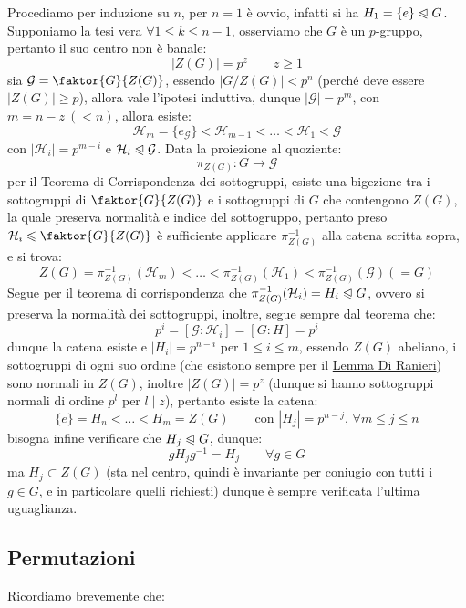\documentclass[11pt]{scrartcl}
\begin{document}
\begin{soln}
    Procediamo per induzione su $n$, per $n = 1$ è ovvio, infatti si ha $H_1 = \{e\} \trianglelefteqslant G$.
    Supponiamo la tesi vera $\forall 1 \leq k \leq n-1$, osserviamo che $G$ è un $p$-gruppo, pertanto il suo centro non è banale:
        \[ |Z(G)| = p^z \qquad z\geq 1
            \]
    sia $\mathcal{G} = \faktor{G}{Z(G)}$, essendo $|G/Z(G)| < p^n$ (perché deve essere $|Z(G)| \geq p$), allora vale l'ipotesi induttiva, dunque
    $|\mathcal{G}| = p^m$, con $m = n-z\ (<n)$, allora esiste:
        \[ \mathcal{H}_m = \{e_{\mathcal{G}}\} < \mathcal{H}_{m-1} < \ldots < \mathcal{H}_1 < \mathcal{G}
            \]
    con $|\mathcal{H}_i| = p^{m-i}$ e $\mathcal{H}_i \trianglelefteqslant \mathcal{G}$. Data la proiezione al quoziente:
        \[ \pi_{Z(G)} : G \longrightarrow \mathcal{G}
            \]
    per il Teorema di Corrispondenza dei sottogruppi, esiste una bigezione tra i sottogruppi di $\faktor{G}{Z(G)}$ e i sottogruppi di
    $G$ che contengono $Z(G)$, la quale preserva normalità e indice del sottogruppo, pertanto preso $\mathcal{H}_i \leqslant \faktor{G}{Z(G)}$ è sufficiente
    applicare $\pi_{Z(G)}^{-1}$ alla catena scritta sopra, e si trova:
        \[ Z(G) = \pi_{Z(G)}^{-1}(\mathcal{H}_{m}) < \ldots < \pi_{Z(G)}^{-1}(\mathcal{H}_{1}) < \pi_{Z(G)}^{-1}(\mathcal{G}) (= G)
            \]
    Segue per il teorema di corrispondenza che $\pi_{Z(G)}^{-1}(\mathcal{H}_i) = H_i \trianglelefteqslant G$, ovvero si preserva la normalità dei sottogruppi, inoltre,
    segue sempre dal teorema che:
        \[ p^i = [\mathcal{G} : \mathcal{H}_i] = [G : H] = p^i
            \]
    dunque la catena esiste  e $|H_i| = p^{n-i}$ per $1\leq i \leq m$, essendo $Z(G)$ abeliano, i sottogruppi di ogni suo ordine (che esistono sempre per il \hyperref[davide]{Lemma Di Ranieri}) sono
    normali in $Z(G)$, inoltre $|Z(G)| = p^z$ (dunque si hanno sottogruppi normali di ordine $p^l$ per $l \mid z$), pertanto esiste la catena:
        \[ \{e\} = H_n < \ldots < H_m = Z(G)
        \qquad \text{con $|H_j| = p^{n-j}$, $\forall m \leq j \leq n$} 
            \]
    bisogna infine verificare che $H_j \trianglelefteqslant G$, dunque:
        \[ gH_jg^{-1} = H_j \qquad \forall g \in G
            \]
    ma $H_j \subset Z(G)$ (sta nel centro, quindi è invariante per coniugio con tutti i $g \in G$, e in particolare quelli richiesti) dunque è sempre verificata l'ultima uguaglianza.
\end{soln}

\newpage
\subsection{Permutazioni}
Ricordiamo brevemente che:
\end{document}
